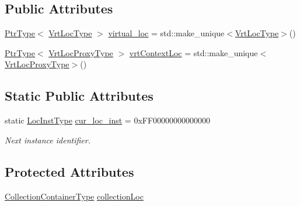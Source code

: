 \subsection*{Public Attributes}
\begin{DoxyCompactItemize}
\item 
\hyperlink{structvt_1_1location_1_1_location_manager_a32d8bca6ed6909a2190286408335d3b4}{Ptr\+Type}$<$ \hyperlink{structvt_1_1location_1_1_location_manager_a06ec1698d93780afdf7873eeaa3a77b6}{Vrt\+Loc\+Type} $>$ \hyperlink{structvt_1_1location_1_1_location_manager_af8cbcba6c30a17a56d69fcf48007cdad}{virtual\+\_\+loc} = std\+::make\+\_\+unique$<$\hyperlink{structvt_1_1location_1_1_location_manager_a06ec1698d93780afdf7873eeaa3a77b6}{Vrt\+Loc\+Type}$>$()
\item 
\hyperlink{structvt_1_1location_1_1_location_manager_a32d8bca6ed6909a2190286408335d3b4}{Ptr\+Type}$<$ \hyperlink{structvt_1_1location_1_1_location_manager_a3e410c85f5790a526a4eda22a9cc7881}{Vrt\+Loc\+Proxy\+Type} $>$ \hyperlink{structvt_1_1location_1_1_location_manager_aec12685db3f4c7c9fec6348496689174}{vrt\+Context\+Loc} = std\+::make\+\_\+unique$<$\hyperlink{structvt_1_1location_1_1_location_manager_a3e410c85f5790a526a4eda22a9cc7881}{Vrt\+Loc\+Proxy\+Type}$>$()
\end{DoxyCompactItemize}
\subsection*{Static Public Attributes}
\begin{DoxyCompactItemize}
\item 
static \hyperlink{namespacevt_1_1location_a4db6456e8024af2d23fc5ae560fef866}{Loc\+Inst\+Type} \hyperlink{structvt_1_1location_1_1_location_manager_a644b4b030fd616375728316281295250}{cur\+\_\+loc\+\_\+inst} = 0x\+F\+F00000000000000
\begin{DoxyCompactList}\small\item\em Next instance identifier. \end{DoxyCompactList}\end{DoxyCompactItemize}
\subsection*{Protected Attributes}
\begin{DoxyCompactItemize}
\item 
\hyperlink{structvt_1_1location_1_1_location_manager_a03472723aecf57cd99cd221ef2164edb}{Collection\+Container\+Type} \hyperlink{structvt_1_1location_1_1_location_manager_a748aa3659f6aee39fb0936e694aa74ac}{collection\+Loc}
\end{DoxyCompactItemize}
